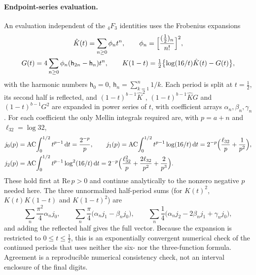 \documentclass[11pt,a4paper]{article}
\numberwithin{equation}{section}
\newcommand{\dd}{\,\mathrm d}
\newcommand{\AC}{\operatorname{AC}}
\begin{document}
\paragraph{Endpoint-series evaluation.}\label{app:cform:endpoint} An evaluation independent of the
${}_4F_3$ identities uses the Frobenius expansions
\begin{equation}
\begin{gathered}
 \hat K(t)=\sum_{n\ge0}\phi_nt^n,\qquad \phi_n=\Bigl[\frac{(\frac12)_n}{n!}\Bigr]^2,\\
 G(t)=4\sum_{n\ge0}\phi_n(\mathsf h_{2n}-\mathsf h_n)t^n,\qquad
 K(1-t)=\tfrac12\bigl\{\log(16/t)\hat K(t)-G(t)\bigr\},
\end{gathered}
 \label{eq:cform:frobenius}
\end{equation}
with the harmonic numbers $\mathsf h_0=0$, $\mathsf h_n=\sum_{k=1}^n1/k$. Each period is split at $t=\frac12$, its second
half is reflected, and $(1-t)^{b-1}\hat K^2$, $(1-t)^{b-1}\hat KG$ and $(1-t)^{b-1}G^2$ are expanded in power series of
$t$, with coefficient arrays $\alpha_n,\beta_n,\gamma_n$. For each coefficient the only Mellin integrals required are,
with $p=a+n$ and $\ell_{32}=\log32$,
\begin{equation}
\begin{aligned}
 j_0(p)&=\AC\!\int_0^{1/2}t^{p-1}\dd t=\frac{2^{-p}}p,\qquad
 j_1(p)=\AC\!\int_0^{1/2}t^{p-1}\log(16/t)\dd t=2^{-p}\Bigl(\frac{\ell_{32}}p+\frac1{p^2}\Bigr),\\
 j_2(p)&=\AC\!\int_0^{1/2}t^{p-1}\log^2(16/t)\dd t=2^{-p}\Bigl(\frac{\ell_{32}^2}p+\frac{2\ell_{32}}{p^2}+\frac2{p^3}\Bigr).
\end{aligned}
\end{equation}
These hold first at $\mathrm{Re}\,p>0$ and continue analytically to the nonzero negative $p$ needed here. The three
unnormalized half-period sums (for $K(t)^2$, $K(t)K(1-t)$ and $K(1-t)^2$) are
\begin{equation}
 \sum_n\frac{\pi^2}{4}\alpha_nj_0,\qquad\sum_n\frac\pi4\bigl(\alpha_nj_1-\beta_nj_0\bigr),\qquad
 \sum_n\frac14\bigl(\alpha_nj_2-2\beta_nj_1+\gamma_nj_0\bigr),
\end{equation}
and adding the reflected half gives the full vector. Because the expansion is restricted to $0\le t\le\frac12$, this is
an exponentially convergent numerical check of the continued periods that uses neither the six- nor the
three-function formula. Agreement is a reproducible numerical consistency check, not an interval enclosure of the
final digits.
\end{document}
